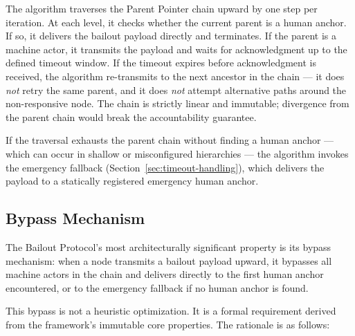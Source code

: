 The algorithm traverses the Parent Pointer chain upward by one step per iteration. At each level, it checks whether the current parent is a human anchor. If so, it delivers the bailout payload directly and terminates. If the parent is a machine actor, it transmits the payload and waits for acknowledgment up to the defined timeout window. If the timeout expires before acknowledgment is received, the algorithm re-transmits to the next ancestor in the chain — it does \textit{not} retry the same parent, and it does \textit{not} attempt alternative paths around the non-responsive node. The chain is strictly linear and immutable; divergence from the parent chain would break the accountability guarantee.

If the traversal exhausts the parent chain without finding a human anchor — which can occur in shallow or misconfigured hierarchies — the algorithm invokes the emergency fallback (Section~\ref{sec:timeout-handling}), which delivers the payload to a statically registered emergency human anchor.

\subsection{Bypass Mechanism}
\label{sec:bypass-mechanism}

The Bailout Protocol's most architecturally significant property is its bypass mechanism: when a node transmits a bailout payload upward, it bypasses all machine actors in the chain and delivers directly to the first human anchor encountered, or to the emergency fallback if no human anchor is found.

This bypass is not a heuristic optimization. It is a formal requirement derived from the framework's immutable core properties. The rationale is as follows:

